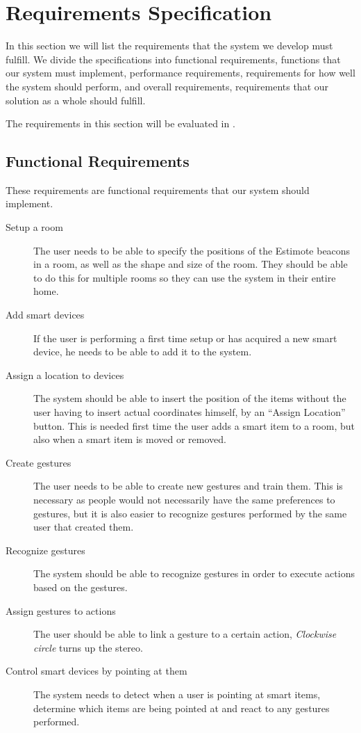 \section{Requirements Specification}
\label{sec:requirements-specification}

In this section we will list the requirements that the system we develop must fulfill.
We divide the specifications into functional requirements, 
\ie functions that our system must implement,
performance requirements,
\ie requirements for how well the system should perform,
and overall requirements, 
\ie requirements that our solution as a whole should fulfill.

The requirements in this section will be evaluated in .

\subsection{Functional Requirements}
These requirements are functional requirements that our system should implement.  
\begin{description}
    \item[Setup a room] The user needs to be able to specify the positions of the Estimote beacons in a room, as well as the shape and size of the room. They should be able to do this for multiple rooms so they can use the system in their entire home.
    \item[Add smart devices] If the user is performing a first time setup or has acquired a new smart device, he needs to be able to add it to the system. 
    \item[Assign a location to devices] The system should be able to insert the position of the items without the user having to insert actual coordinates himself, \eg by an ``Assign Location'' button. This is needed first time the user adds a smart item to a room, but also when a smart item is moved or removed.
    \item[Create gestures] The user needs to be able to create new gestures and train them. This is necessary as people would not necessarily have the same preferences to gestures, but it is also easier to recognize gestures performed by the same user that created them.
    \item[Recognize gestures] The system should be able to recognize gestures in order to execute actions based on the gestures.
    \item[Assign gestures to actions] The user should be able to link a gesture to a certain action, \eg \textit{Clockwise circle} turns up the stereo.
    \item[Control smart devices by pointing at them] The system needs to detect when a user is pointing at smart items, determine which items are being pointed at and react to any gestures performed.
\end{description}

